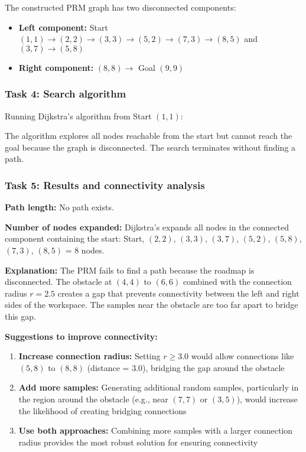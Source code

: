 \documentclass[11pt]{article}
\begin{document}
The constructed PRM graph has two disconnected components:
\begin{itemize}
    \item \textbf{Left component:} Start $(1,1) \rightarrow (2,2) \rightarrow (3,3) \rightarrow (5,2) \rightarrow (7,3) \rightarrow (8,5)$ and $(3,7) \rightarrow (5,8)$
    \item \textbf{Right component:} $(8,8) \rightarrow$ Goal $(9,9)$
\end{itemize}

\subsubsection{Task 4: Search algorithm}

Running Dijkstra's algorithm from Start $(1,1)$:

The algorithm explores all nodes reachable from the start but cannot reach the goal because the graph is disconnected. The search terminates without finding a path.

\subsubsection{Task 5: Results and connectivity analysis}

\textbf{Path length:} No path exists.

\textbf{Number of nodes expanded:} Dijkstra's expands all nodes in the connected component containing the start: Start, $(2,2)$, $(3,3)$, $(3,7)$, $(5,2)$, $(5,8)$, $(7,3)$, $(8,5)$ = 8 nodes.

\textbf{Explanation:} The PRM fails to find a path because the roadmap is disconnected. The obstacle at $(4,4)$ to $(6,6)$ combined with the connection radius $r = 2.5$ creates a gap that prevents connectivity between the left and right sides of the workspace. The samples near the obstacle are too far apart to bridge this gap.

\textbf{Suggestions to improve connectivity:}
\begin{enumerate}
    \item \textbf{Increase connection radius:} Setting $r \geq 3.0$ would allow connections like $(5,8)$ to $(8,8)$ (distance = 3.0), bridging the gap around the obstacle
    \item \textbf{Add more samples:} Generating additional random samples, particularly in the region around the obstacle (e.g., near $(7,7)$ or $(3,5)$), would increase the likelihood of creating bridging connections
    \item \textbf{Use both approaches:} Combining more samples with a larger connection radius provides the most robust solution for ensuring connectivity
\end{enumerate}
\end{document}
